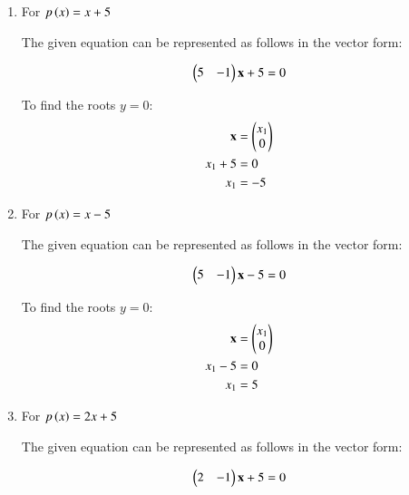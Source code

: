 \renewcommand{\theequation}{\theenumi}
\begin{enumerate}

\item \solution For $p\left(x\right) = x + 5$ 
\begin{flushleft}
The given equation can be represented as follows in the vector form:
\end{flushleft}
\begin{align}
\begin{pmatrix}
5 & -1
\end{pmatrix}
\mathbf{x} + 5 = 0
\end{align}

To find the roots $y=0$: 
\begin{align}
\mathbf{x} &= \begin{pmatrix}x_1\\0\end{pmatrix} \\
x_1 + 5 &= 0 \\
x_1 &= -5
\end{align}
\item \solution For $p\left(x\right) = x - 5$
\begin{flushleft}
The given equation can be represented as follows in the vector form:
\end{flushleft}
\begin{align}
\begin{pmatrix}
5 & -1 
\end{pmatrix}
\mathbf{x} - 5 = 0
\end{align}

To find the roots $y=0$:
\begin{align}
\mathbf{x} &= \begin{pmatrix}x_1\\0\end{pmatrix} \\
x_1 - 5 &= 0 \\
x_1 &= 5
\end{align}
\item \solution For $p\left(x\right) = 2x + 5$
\begin{flushleft}
The given equation can be represented as follows in the vector form:
\end{flushleft}
\begin{align}
\begin{pmatrix}
2 & -1 
\end{pmatrix}
\mathbf{x} + 5 = 0
\end{align}


\end{enumerate}
